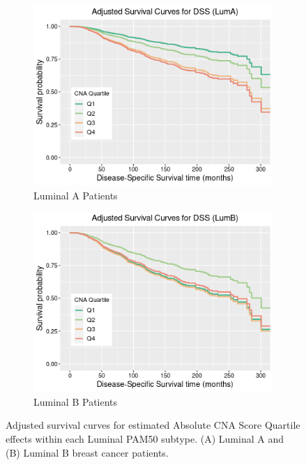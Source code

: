 \begin{figure}[!htb]
\centering
\begin{subfigure}[b]{0.49\linewidth}       
\centering
\includegraphics[width=\linewidth]{../figures/Chapter_3/LuminalA_Adsurvplot.png}
\caption{Luminal A Patients}
\label{fig:A}
\end{subfigure}
\begin{subfigure}[b]{0.49\linewidth}        
\centering
\includegraphics[width=\linewidth]{../figures/Chapter_3/LuminalB_Adsurvplot.png}
\caption{Luminal B Patients}
\label{fig:B}
\end{subfigure}
\caption[Adjusted survival curves for estimated Absolute CNA Score Quartile effects within each Luminal PAM50 subtype.]{Adjusted survival curves for estimated Absolute CNA Score Quartile effects within each Luminal PAM50 subtype. (A) Luminal A and (B) Luminal B breast cancer patients.}
\label{fig:CNAQuartileSurvivalAdusted}
\end{figure}
\FloatBarrier 

